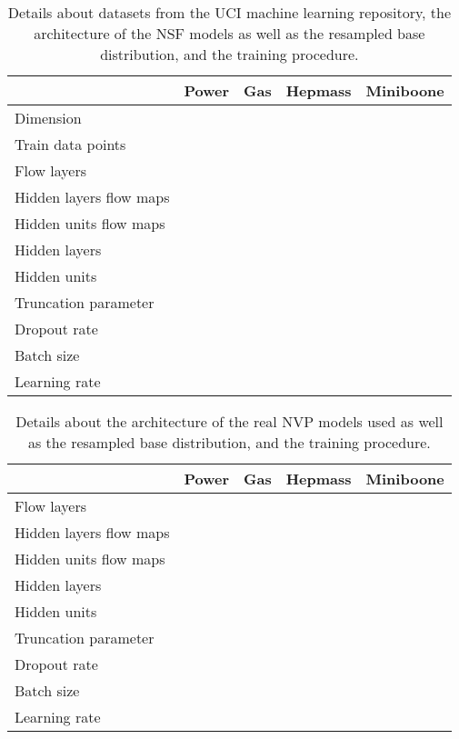 \documentclass[twoside]{article}
\begin{document}
\begin{table*}[h]
  \caption{Details about datasets from the UCI machine learning repository, the architecture of the NSF models as well as the resampled base distribution, and the training procedure.}
  \label{tab:uci_details_nsf}
  \centering
  \vspace{0.3cm}
  \begin{tabular}{l|llll}
     & Power & Gas & Hepmass & Miniboone \\
    \hline
    Dimension &  &  &  &  \\
    Train data points &  &  &  &  \\
    \hline
    Flow layers &  &  &  &  \\
    Hidden layers flow maps &  &  &  &  \\
    Hidden units flow maps &  &  &  &  \\
    \hline
    Hidden layers  &  &  &  &  \\
    Hidden units  &  &  &  &  \\
    Truncation parameter  &  &  &  &  \\
    \hline
    Dropout rate &  &  &  &  \\
    Batch size &  &  &  &  \\
    Learning rate &  &  &  & 
  \end{tabular}
\end{table*}

\begin{table*}[h]
  \caption{Details about the architecture of the real NVP models used as well as the resampled base distribution, and the training procedure.}
  \label{tab:uci_details_rnvp}
  \centering
  \vspace{0.3cm}
  \begin{tabular}{l|llll}
     & Power & Gas & Hepmass & Miniboone \\
    \hline
    Flow layers &  &  &  &  \\
    Hidden layers flow maps &  &  &  &  \\
    Hidden units flow maps &  &  &  &  \\
    \hline
    Hidden layers  &  &  &  &  \\
    Hidden units  &  &  &  &  \\
    Truncation parameter  &  &  &  &  \\
    \hline
    Dropout rate &  &  &  &  \\
    Batch size &  &  &  &  \\
    Learning rate &  &  &  & 
  \end{tabular}
\end{table*}
\end{document}
